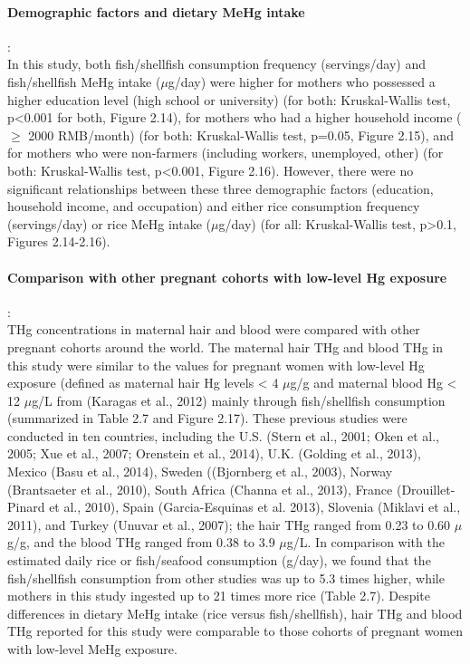 \paragraph{Demographic factors and dietary MeHg intake}:\\ In this study, both fish/shellfish consumption frequency (servings/day) and fish/shellfish MeHg intake (\({\mu}\)g/day) were higher for mothers who possessed a higher education level (high school or university) (for both: Kruskal-Wallis test, p<0.001 for both, Figure 2.14), for mothers who had a higher household income ( ${\ge}$ 2000 RMB/month) (for both: Kruskal-Wallis test, p=0.05, Figure 2.15), and for mothers who were non-farmers (including workers, unemployed, other) (for both: Kruskal-Wallis test, p<0.001, Figure 2.16). However, there were no significant relationships between these three demographic factors (education, household income, and occupation) and either rice consumption frequency (servings/day) or rice MeHg intake (\({\mu}\)g/day) (for all: Kruskal-Wallis test, p>0.1, Figures 2.14-2.16). 

\paragraph {Comparison with other pregnant cohorts with low-level Hg exposure}:\\ THg concentrations in maternal hair and blood were compared with other pregnant cohorts around the world. The maternal hair THg and blood THg in this study were similar to the values for pregnant women with low-level Hg exposure (defined as maternal hair Hg levels < 4 \({\mu}\)g/g and maternal blood Hg < 12 \({\mu}\)g/L from (Karagas et al., 2012) mainly through fish/shellfish consumption (summarized in Table 2.7 and Figure 2.17). These previous studies were conducted in ten countries, including the U.S. (Stern et al., 2001; Oken et al., 2005; Xue et al., 2007; Orenstein et al., 2014), U.K. (Golding et al., 2013),  Mexico (Basu et al., 2014), Sweden ((Bjornberg et al., 2003), Norway (Brantsaeter et al., 2010), South Africa (Channa et al., 2013), France (Drouillet-Pinard et al., 2010), Spain (Garcia-Esquinas et al. 2013), Slovenia (Miklavi et al., 2011), and Turkey (Unuvar et al., 2007); the hair THg ranged from 0.23 to 0.60 \({\mu}\)g/g, and the blood THg ranged from 0.38 to 3.9 \({\mu}\)g/L. In comparison with the estimated daily rice or fish/seafood consumption (g/day), we found that the fish/shellfish consumption from other studies was up to 5.3 times higher, while mothers in this study ingested up to 21 times more rice (Table 2.7). Despite differences in dietary MeHg intake (rice versus fish/shellfish), hair THg and blood THg reported for this study were comparable to those cohorts of pregnant women with low-level MeHg exposure. 

